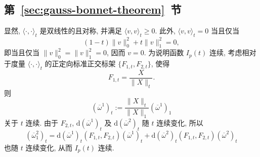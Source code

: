 \subsection{\texorpdfstring{第~\ref{sec:gauss-bonnet-theorem}~节}{Gauss–Bonnet 定理}}\label{subsec:solutions-gauss-bonnet-theorem}

\begin{description}[font=\normalfont,leftmargin=2em,labelwidth=1.5em]
显然, $\langle\cdot,\cdot\rangle_t$ 是双线性的且对称, 并满足 $\langle v,v\rangle_t\ge0$. 此外, $\langle v,v\rangle_t=0$ 当且仅当
\[
  (1-t)\lVert v\rVert_0^2+t\lVert v\rVert_1^2=0,
\]
即当且仅当 $\lVert v\rVert_0^2=\lVert v\rVert_1^2=0$, 因而 $v=0$. 为说明函数 $I_p(t)$ 连续, 考虑相对于度量 $\langle\cdot,\cdot\rangle_t$ 的正定向标准正交标架 $\{F_{1,t},F_{2,t}\}$, 使得
\[
  F_{1,t}=\frac X{\lVert X\rVert_t}.
\]
则
\[
  (\overline\omega^1)_t:=\frac{\lVert X\rVert_t}{\lVert X\rVert_1}(\overline\omega^1)_1
\]
关于 $t$ 连续. 由于 $F_{2,t}$, $\mathrm{d}(\overline\omega^1)_t$ 及 $\mathrm{d}(\overline\omega^2)_t$ 随 $t$ 连续变化, 所以
\[
  (\overline\omega_1^2)_t
  =\mathrm{d}(\overline\omega^1)_t(F_{1,t},F_{2,t})(\overline\omega^1)_t
  +\mathrm{d}(\overline\omega^2)_t(F_{1,t},F_{2,t})(\overline\omega^2)_t
\]
也随 $t$ 连续变化, 从而 $I_p(t)$ 连续.


\end{description}
